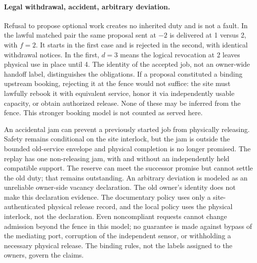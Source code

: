 \documentclass[11pt]{article}
\begin{document}
\paragraph{Legal withdrawal, accident, arbitrary deviation.}
Refusal to propose optional work creates no inherited duty and is not a fault. In the lawful matched pair the same proposal sent at $-2$ is delivered at 1 versus 2, with $f=2$. It starts in the first case and is rejected in the second, with identical withdrawal notices. In the first, $d=3$ means the logical revocation at 2 leaves physical use in place until 4. The identity of the accepted job, not an owner-wide handoff label, distinguishes the obligations. If a proposal constituted a binding upstream booking, rejecting it at the fence would not suffice: the site must lawfully rebook it with equivalent service, honor it via independently usable capacity, or obtain authorized release. None of these may be inferred from the fence. This stronger booking model is not counted as served here.

An accidental jam can prevent a previously started job from physically releasing. Safety remains conditional on the site interlock, but the jam is outside the bounded old-service envelope and physical completion is no longer promised. The replay has one non-releasing jam, with and without an independently held compatible support. The reserve can meet the successor promise but cannot settle the old duty; that remains outstanding. An arbitrary deviation is modeled as an unreliable owner-side vacancy declaration. The old owner's identity does not make this declaration evidence. The documentary policy uses only a site-authenticated physical release record, and the local policy uses the physical interlock, not the declaration. Even noncompliant requests cannot change admission beyond the fence in this model; no guarantee is made against bypass of the mediating port, corruption of the independent sensor, or withholding a necessary physical release. The binding rules, not the labels assigned to the owners, govern the claims.
\end{document}
